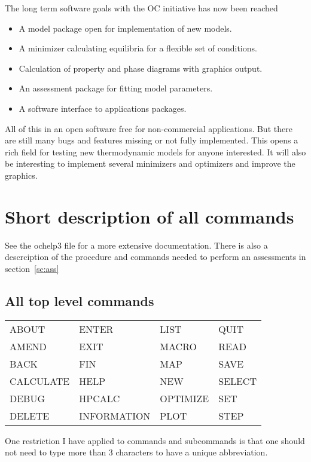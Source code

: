 \documentclass[12pt]{article}
\begin{document}
The long term software goals with the OC initiative has now been
reached 
\begin{itemize}
\item A model package open for implementation of new models.
\item A minimizer calculating equilibria for a flexible set of conditions.
\item Calculation of property and phase diagrams with graphics output.
\item An assessment package for fitting model parameters.  
\item A software interface to applications packages.
\end{itemize}
All of this in an open software free for non-commercial applications.
But there are still many bugs and features missing or not fully
implemented.  This opens a rich field for testing new thermodynamic
models for anyone interested.  It will also be interesting to
implement several minimizers and optimizers and improve the graphics.

\section{Short description of all commands}

See the ochelp3 file for a more extensive documentation.  There is
also a descrciption of the procedure and commands needed to perform an
assessments in section~\ref{sc:ass}

\subsection{All top level commands}

\begin{tabular}{llll}
 ABOUT        &   ENTER        &   LIST        &     QUIT\\
 AMEND        &   EXIT         &   MACRO       &     READ\\
 BACK         &   FIN          &   MAP         &     SAVE\\
 CALCULATE    &   HELP         &   NEW         &     SELECT\\
 DEBUG        &   HPCALC       &   OPTIMIZE    &     SET\\
 DELETE       &   INFORMATION  &   PLOT        &     STEP\\
\end{tabular}

One restriction I have applied to commands and subcommands is that one
should not need to type more than 3 characters to have a unique
abbreviation.
\end{document}
